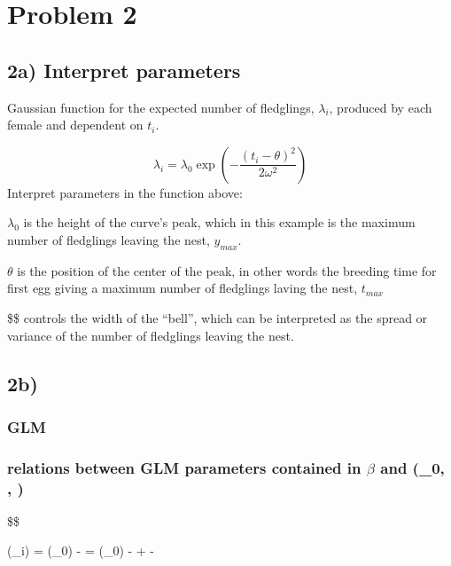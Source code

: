 \documentclass[
]{article}
\begin{document}
\hypertarget{problem-2}{%
\section{Problem 2}\label{problem-2}}

\hypertarget{a-interpret-parameters}{%
\subsection{2a) Interpret parameters}\label{a-interpret-parameters}}

Gaussian function for the expected number of fledglings, \(\lambda_i\),
produced by each female and dependent on \(t_i\).

\[\lambda_i = \lambda_0 \exp( -\frac{(t_i-\theta)^2}{2 \omega^2})\]
Interpret parameters in the function above:

\(\lambda_0\) is the height of the curve's peak, which in this example
is the maximum number of fledglings leaving the nest, \(y_{max}\).

\(\theta\) is the position of the center of the peak, in other words the
breeding time for first egg giving a maximum number of fledglings laving
the nest, \(t_{max}\)

\$\omega \$ controls the width of the ``bell'', which can be interpreted
as the spread or variance of the number of fledglings leaving the nest.

\hypertarget{b}{%
\subsection{2b)}\label{b}}

\hypertarget{glm}{%
\subsubsection{GLM}\label{glm}}

\hypertarget{relations-between-glm-parameters-contained-in-beta-and-_0}{%
\subsubsection{\texorpdfstring{relations between GLM parameters
contained in \(\beta\) and (\lambda\_0, \theta,
\omega)}{relations between GLM parameters contained in \textbackslash beta and (\_0, , )}}\label{relations-between-glm-parameters-contained-in-beta-and-_0}}

\$\$

\log (\lambda\_i) = \log (\lambda\_0) -
= \log (\lambda\_0) -  + 
- \frac{\theta}{2\omega}
\end{document}
